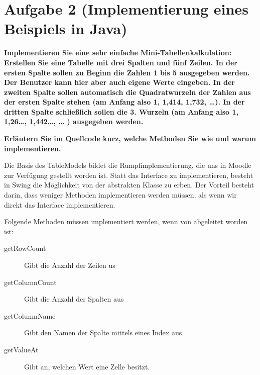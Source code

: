 \section{Aufgabe 2 (Implementierung eines Beispiels in Java)}
\textbf{Implementieren Sie eine sehr einfache Mini-Tabellenkalkulation:
Erstellen Sie eine Tabelle mit drei Spalten und fünf Zeilen. In der ersten Spalte sollen zu
Beginn die Zahlen 1 bis 5 ausgegeben werden. Der Benutzer kann hier aber auch eigene
Werte eingeben. In der zweiten Spalte sollen automatisch die Quadratwurzeln der Zahlen
aus der ersten Spalte stehen (am Anfang also 1, 1,414, 1,732, …). In der dritten Spalte
schließlich sollen die 3. Wurzeln (am Anfang also 1, 1,26…, 1,442…, … ) ausgegeben
werden.}

\textbf{Erläutern Sie im Quellcode kurz, welche Methoden Sie wie und warum
implementieren.}

Die Basis des TableModels bildet die Rumpfimplementierung, die uns in Moodle zur
Verfügung gestellt worden ist. Statt das Interface  zu
implementieren, besteht in Swing die Möglichkeit von der abstrakten Klasse 
 zu erben. Der Vorteil besteht darin, dass weniger
Methoden implementieren werden müssen, als wenn wir direkt das Interface
implementieren.

Folgende Methoden müssen implementiert werden, wenn von
 abgeleitet worden ist:

\begin{description}
\item[getRowCount] Gibt die Anzahl der Zeilen us
\item[getColumnCount] Gibt die Anzahl der Spalten aus
\item[getColumnName] Gibt den Namen der Spalte mittels eines Index aus
\item[getValueAt] Gibt an, welchen Wert eine Zelle besitzt.
\end{description}


